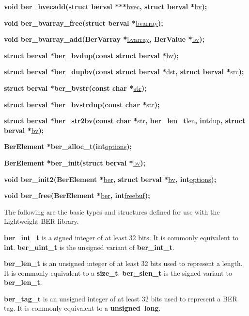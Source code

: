 \documentclass[]{article}
\let\realtextbf=\textbf
\renewcommand{\textbf}[1]{\textcolor{boldcolor}{\realtextbf{#1}}}
\renewcommand{\emph}[1]{\underline{#1}}
\begin{document}
\textbf{void ber\_bvecadd(struct berval ***}\emph{bvec}\textbf{, struct
berval *}\emph{bv}\textbf{);}

\textbf{void ber\_bvarray\_free(struct berval
*}\emph{bvarray}\textbf{);}

\textbf{void ber\_bvarray\_add(BerVarray *}\emph{bvarray}\textbf{,
BerValue *}\emph{bv}\textbf{);}

\textbf{struct berval *ber\_bvdup(const struct berval
*}\emph{bv}\textbf{);}

\textbf{struct berval *ber\_dupbv(const struct berval
*}\emph{dst}\textbf{, struct berval *}\emph{src}\textbf{);}

\textbf{struct berval *ber\_bvstr(const char *}\emph{str}\textbf{);}

\textbf{struct berval *ber\_bvstrdup(const char *}\emph{str}\textbf{);}

\textbf{struct berval *ber\_str2bv(const char *}\emph{str}\textbf{,
ber\_len\_t}\emph{len}\textbf{, int}\emph{dup}\textbf{, struct berval
*}\emph{bv}\textbf{);}

\textbf{BerElement *ber\_alloc\_t(int}\emph{options}\textbf{);}

\textbf{BerElement *ber\_init(struct berval *}\emph{bv}\textbf{);}

\textbf{void ber\_init2(BerElement *}\emph{ber}\textbf{, struct berval
*}\emph{bv}\textbf{, int}\emph{options}\textbf{);}

\textbf{void ber\_free(BerElement *}\emph{ber}\textbf{,
int}\emph{freebuf}\textbf{);}


The following are the basic types and structures defined for use with
the Lightweight BER library.

\textbf{ber\_int\_t} is a signed integer of at least 32 bits. It is
commonly equivalent to \textbf{int}. \textbf{ber\_uint\_t} is the
unsigned variant of \textbf{ber\_int\_t}.

\textbf{ber\_len\_t} is an unsigned integer of at least 32 bits used to
represent a length. It is commonly equivalent to a \textbf{size\_t}.
\textbf{ber\_slen\_t} is the signed variant to \textbf{ber\_len\_t}.

\textbf{ber\_tag\_t} is an unsigned integer of at least 32 bits used to
represent a BER tag. It is commonly equivalent to a
\textbf{unsigned~long}.
\end{document}
